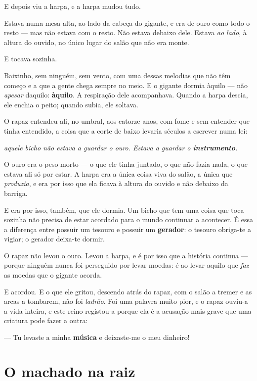 \documentclass[livro.tex]{subfiles}
\begin{document}
\medskip

E depois viu a harpa, e a harpa mudou tudo.

Estava numa mesa alta, ao lado da cabeça do gigante, e era de ouro como todo o resto ---
mas não estava com o resto. Não estava debaixo dele. Estava \emph{ao lado}, à altura do
ouvido, no único lugar do salão que não era monte.

E tocava sozinha.

Baixinho, sem ninguém, sem vento, com uma dessas melodias que não têm começo e a que a
gente chega sempre no meio. E o gigante dormia àquilo --- não \emph{apesar} daquilo:
\textbf{àquilo}. A respiração dele acompanhava. Quando a harpa descia, ele enchia o peito;
quando subia, ele soltava.

\medskip

O rapaz entendeu ali, no umbral, aos catorze anos, com fome e sem entender que tinha
entendido, a coisa que a corte de baixo levaria séculos a escrever numa lei:

\emph{aquele bicho não estava a guardar o ouro. Estava a guardar o \textbf{instrumento}.}

O ouro era o peso morto --- o que ele tinha juntado, o que não fazia nada, o que estava
ali só por estar. A harpa era a única coisa viva do salão, a única que \emph{produzia},
e era por isso que ela ficava à altura do ouvido e não debaixo da barriga.

E era por isso, também, que ele dormia. Um bicho que tem uma coisa que toca sozinha não
precisa de estar acordado para o mundo continuar a acontecer. É essa a diferença entre
possuir um tesouro e possuir um \textbf{gerador}: o tesouro obriga-te a vigiar; o gerador
deixa-te dormir.

\medskip

O rapaz não levou o ouro. Levou a harpa, e é por isso que a história continua --- porque
ninguém nunca foi perseguido por levar moedas: é ao levar aquilo que \emph{faz} as moedas
que o gigante acorda.

E acordou. E o que ele gritou, descendo atrás do rapaz, com o salão a tremer e as arcas a
tombarem, não foi \emph{ladrão}. Foi uma palavra muito pior, e o rapaz ouviu-a a vida
inteira, e este reino registou-a porque ela é a acusação mais grave que uma criatura pode
fazer a outra:

--- Tu levaste a minha \textbf{música} e deixaste-me o meu dinheiro!

\chapter{O machado na raiz}
\end{document}
